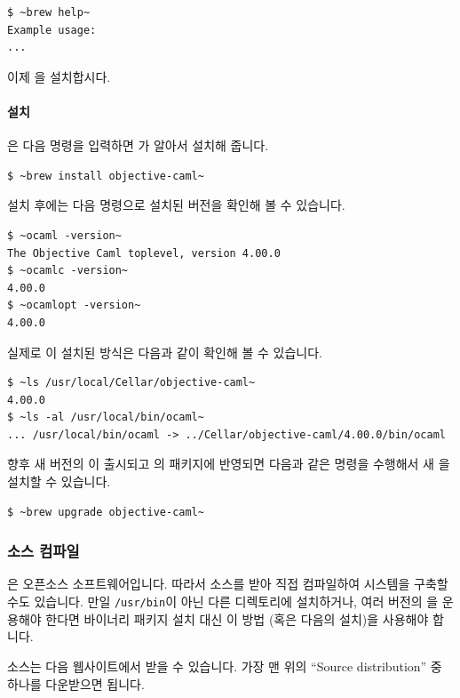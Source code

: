 \begin{lstlisting}
$ ~brew help~
Example usage:
...
\end{lstlisting}

이제 \OCAML{}을 설치합시다.

\paragraph{설치} \OCAML{}은 다음 명령을 입력하면 \BREW{}가 알아서 설치해
줍니다.

\begin{lstlisting}
$ ~brew install objective-caml~
\end{lstlisting}

설치 후에는 다음 명령으로 설치된 \OCAML{} 버전을 확인해 볼 수 있습니다.

\begin{lstlisting}
$ ~ocaml -version~
The Objective Caml toplevel, version 4.00.0
$ ~ocamlc -version~
4.00.0
$ ~ocamlopt -version~
4.00.0
\end{lstlisting}

실제로 \OCAML{}이 설치된 방식은 다음과 같이 확인해 볼 수 있습니다.

\begin{lstlisting}
$ ~ls /usr/local/Cellar/objective-caml~
4.00.0
$ ~ls -al /usr/local/bin/ocaml~
... /usr/local/bin/ocaml -> ../Cellar/objective-caml/4.00.0/bin/ocaml
\end{lstlisting}

향후 새 버전의 \OCAML{}이 출시되고 \BREW{}의 \OCAML{} 패키지에 반영되면
다음과 같은 명령을 수행해서 새 \OCAML{}을 설치할 수 있습니다.

\begin{lstlisting}
$ ~brew upgrade objective-caml~
\end{lstlisting}

\subsubsection{\OCAML{} 소스 컴파일}


\OCAML{}은 오픈소스 소프트웨어입니다. 따라서 소스를 받아 직접 컴파일하여
\OCAML{} 시스템을 구축할 수도 있습니다. 만일 \OCAML{}\을 \texttt{/usr/bin}이
아닌 다른 디렉토리에 설치하거나, 여러 버전의 \OCAML{}을 운용해야 한다면
바이너리 패키지 설치 대신 이 방법 (혹은 다음의 \GODI{} 설치)을 사용해야
합니다.

\OCAML{} 소스는 다음 웹사이트에서 받을 수 있습니다. 가장 맨 위의 ``Source
distribution'' 중 하나를 다운받으면 됩니다.

